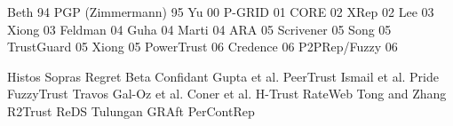 Beth 94\cite{beth1994valuation}
PGP (Zimmermann) 95\cite{zimmermann1995official}
Yu 00\cite{yu2000social}
P-GRID 01\cite{aberer2001p}
CORE 02\cite{michiardi2002core}
XRep 02\cite{damiani2002reputation}
Lee 03\cite{lee2003cooperative}
Xiong 03\cite{xiong2003reputation}
Feldman 04\cite{feldman2004robust}
Guha 04\cite{guha2004propagation}
Marti 04\cite{marti2004limited}
ARA 05\cite{ham2005ara}
Scrivener 05\cite{nandi2005scrivener}
Song 05\cite{song2005trusted}
TrustGuard 05\cite{srivatsa2005trustguard}
Xiong 05\cite{xiong2007countering}
PowerTrust 06\cite{zhou2007powertrust}
Credence 06\cite{walsh2006experience}
P2PRep/Fuzzy 06\cite{aringhieri2006fuzzy}

Histos
Sopras
Regret
Beta
Confidant
Gupta et al.
PeerTrust
Ismail et al.
Pride
FuzzyTrust
Travos
Gal-Oz et al.
Coner et al.
H-Trust
RateWeb
Tong and Zhang
R2Trust
ReDS
Tulungan
GRAft
PerContRep



